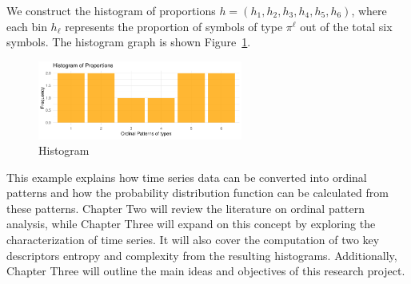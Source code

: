 We construct the histogram of proportions $h=(h_1,h_2,h_3,h_4,h_5,h_6)$, where each bin $h_\ell$ represents the proportion of symbols of type $\pi^\ell$ out of the total six symbols. The histogram graph is shown Figure~\ref{fig:histogram}.

\begin{figure}[hbt]
	\centering
	\includegraphics[width=0.6\textwidth]{frequency histogram}
	\caption{Histogram}
	\label{fig:histogram}
\end{figure}

This example explains how time series data can be converted into ordinal patterns and how the probability distribution function can be calculated from these patterns. Chapter Two will review the literature on ordinal pattern analysis, while Chapter Three will expand on this concept by exploring the characterization of time series. It will also cover the computation of two key descriptors entropy and complexity from the resulting histograms. Additionally, Chapter Three will outline the main ideas and objectives of this research project.      






